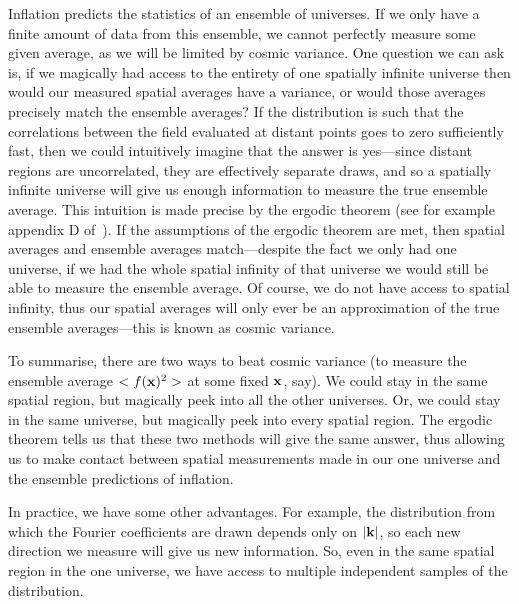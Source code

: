     Inflation predicts the statistics of an ensemble of universes.
    If we only have a finite amount of data from this ensemble,
    we cannot perfectly measure some given average, as we will be limited by cosmic variance.
    One question we can ask is, if we magically had access to the entirety of one spatially
    infinite universe then would our measured spatial averages have a variance,
    or would those averages precisely match the ensemble averages?
    If the distribution is such that the correlations between the field evaluated at distant
    points goes to zero sufficiently fast, then we could intuitively imagine that the answer is
    yes---since distant regions are uncorrelated, they are effectively separate draws, and
    so a spatially infinite universe will give us enough information to measure the true
    ensemble average. This intuition is made precise by the ergodic theorem
    (see for example appendix D of~\cite{Weinberg_cosmo}).
    If the assumptions of the ergodic theorem are met,
    then spatial averages and ensemble averages
    match---despite the fact we only had one universe,
    if we had the whole spatial infinity of that universe
    we would still be able to measure the ensemble average.
    Of course, we do not have access to spatial infinity,
    thus our spatial averages will only ever be an approximation of the
    true ensemble averages---this is known as cosmic variance.


    To summarise,
    there are two ways to beat cosmic variance (to measure the ensemble
    average $<f(\mathbf{x})^2>$ at some fixed $\mathbf{x}$, say).
    We could stay in the same spatial region, but magically peek into all the other universes.
    Or, we could stay in the same universe, but magically peek into every spatial region.
    The ergodic theorem tells us that these two methods will give the same answer,
    thus allowing us to make contact between spatial measurements made in
    our one universe and the ensemble predictions of inflation.


    In practice, we have some other advantages.
    For example, the distribution from which the Fourier coefficients are drawn
    depends only on $|\mathbf{k}|$, so each new direction we measure will give us new information.
    So, even in the same spatial region in the one universe, we have access to multiple independent samples of the distribution.


